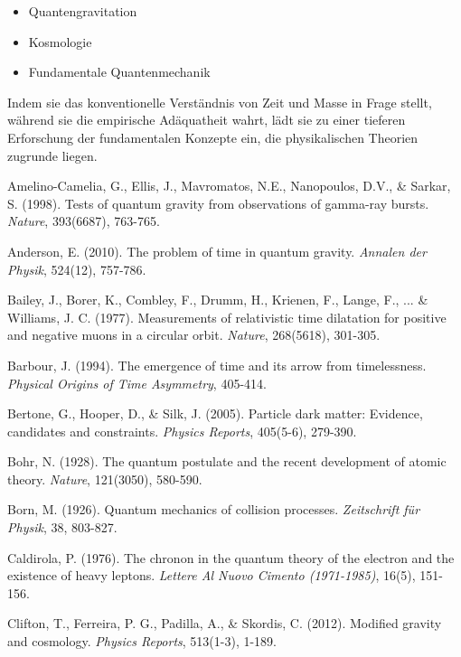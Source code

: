 \documentclass[a4paper,12pt]{article}
\begin{document}
	\begin{itemize}
		\item Quantengravitation
		\item Kosmologie
		\item Fundamentale Quantenmechanik
	\end{itemize}
	
	Indem sie das konventionelle Verständnis von Zeit und Masse in Frage stellt, während sie die empirische Adäquatheit wahrt, lädt sie zu einer tieferen Erforschung der fundamentalen Konzepte ein, die physikalischen Theorien zugrunde liegen.
	
	\begin{thebibliography}{99}
		 Amelino-Camelia, G., Ellis, J., Mavromatos, N.E., Nanopoulos, D.V., \& Sarkar, S. (1998). Tests of quantum gravity from observations of gamma-ray bursts. \textit{Nature}, 393(6687), 763-765.
		
		 Anderson, E. (2010). The problem of time in quantum gravity. \textit{Annalen der Physik}, 524(12), 757-786.
		
		 Bailey, J., Borer, K., Combley, F., Drumm, H., Krienen, F., Lange, F., ... \& Williams, J. C. (1977). Measurements of relativistic time dilatation for positive and negative muons in a circular orbit. \textit{Nature}, 268(5618), 301-305.
		
		 Barbour, J. (1994). The emergence of time and its arrow from timelessness. \textit{Physical Origins of Time Asymmetry}, 405-414.
		
		 Bertone, G., Hooper, D., \& Silk, J. (2005). Particle dark matter: Evidence, candidates and constraints. \textit{Physics Reports}, 405(5-6), 279-390.
		
		 Bohr, N. (1928). The quantum postulate and the recent development of atomic theory. \textit{Nature}, 121(3050), 580-590.
		
		 Born, M. (1926). Quantum mechanics of collision processes. \textit{Zeitschrift für Physik}, 38, 803-827.
		
		 Caldirola, P. (1976). The chronon in the quantum theory of the electron and the existence of heavy leptons. \textit{Lettere Al Nuovo Cimento (1971-1985)}, 16(5), 151-156.
		
		 Clifton, T., Ferreira, P. G., Padilla, A., \& Skordis, C. (2012). Modified gravity and cosmology. \textit{Physics Reports}, 513(1-3), 1-189.
		

\end{thebibliography}
\end{document}
